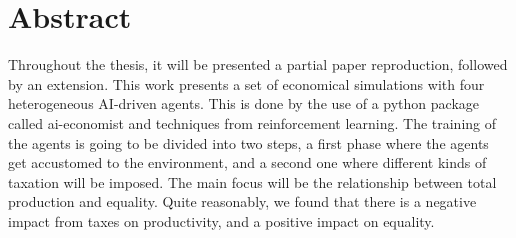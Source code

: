 \documentclass[12pt,a4paper,openright]{report}
\numberwithin{equation}{section}
\begin{document}
 




\begin{comment}

\begin{titlepage} 
\thispagestyle{empty}                   %
\topmargin=6.5cm                        %
\raggedleft                             %
\large                                  %
\em                                     %
Questa è la \textsc{Dedica}:\\
ognuno può scrivere quello che vuole, \\
anche nulla \ldots                   
\newpage                               
\end{titlepage}
       
\end{comment}



\chapter*{Abstract}             

Throughout the thesis, it will be presented a partial paper reproduction, followed by an extension. This work presents a set of economical simulations with four heterogeneous AI-driven agents. This is done by the use of a python package called ai-economist\cite{aie-pypi} and techniques from reinforcement learning. The training of the agents is going to be divided into two steps, a first phase where the agents get accustomed to the environment, and a second one where different kinds of taxation will be imposed. The main focus will be the relationship between total production and equality. Quite reasonably, we found that there is a negative impact from taxes on productivity, and a positive impact on equality.
\end{document}
